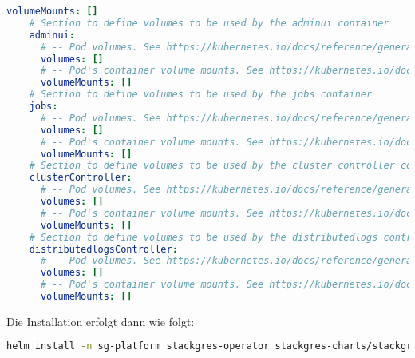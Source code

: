\begin{lstlisting}[language=yaml, caption=StackGres-Citus - Helm Chart Manifest,captionpos=b,label={lst:stackgres_citus-values.yaml},breaklines=true]
      volumeMounts: []
    # Section to define volumes to be used by the adminui container
    adminui:
      # -- Pod volumes. See https://kubernetes.io/docs/reference/generated/kubernetes-api/v1.27/#volume-v1-core
      volumes: []
      # -- Pod's container volume mounts. See https://kubernetes.io/docs/reference/generated/kubernetes-api/v1.27/#volumemount-v1-core
      volumeMounts: []
    # Section to define volumes to be used by the jobs container
    jobs:
      # -- Pod volumes. See https://kubernetes.io/docs/reference/generated/kubernetes-api/v1.27/#volume-v1-core
      volumes: []
      # -- Pod's container volume mounts. See https://kubernetes.io/docs/reference/generated/kubernetes-api/v1.27/#volumemount-v1-core
      volumeMounts: []
    # Section to define volumes to be used by the cluster controller container
    clusterController:
      # -- Pod volumes. See https://kubernetes.io/docs/reference/generated/kubernetes-api/v1.27/#volume-v1-core
      volumes: []
      # -- Pod's container volume mounts. See https://kubernetes.io/docs/reference/generated/kubernetes-api/v1.27/#volumemount-v1-core
      volumeMounts: []
    # Section to define volumes to be used by the distributedlogs controller container
    distributedlogsController:
      # -- Pod volumes. See https://kubernetes.io/docs/reference/generated/kubernetes-api/v1.27/#volume-v1-core
      volumes: []
      # -- Pod's container volume mounts. See https://kubernetes.io/docs/reference/generated/kubernetes-api/v1.27/#volumemount-v1-core
      volumeMounts: []
\end{lstlisting}

Die Installation erfolgt dann wie folgt:
\lstset{style=gra_codestyle}
\begin{lstlisting}[language=bash, caption=StackGres-Citus - Installation,captionpos=b,label={lst:stackgres_citus-values-apply},breaklines=true]
helm install -n sg-platform stackgres-operator stackgres-charts/stackgres-operator -f /home/gramic/PycharmProjects/rke2_settings/stackgres_citus/stackgres_citus/values.yaml
\end{lstlisting}

